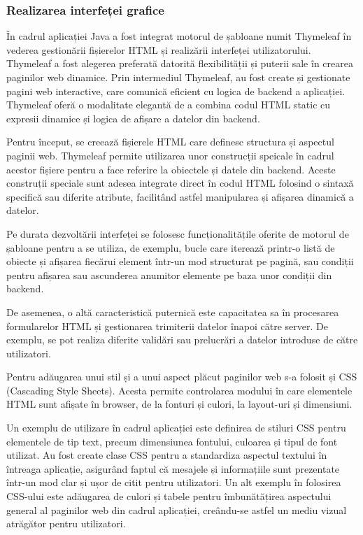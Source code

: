 \documentclass[12pt]{article}
\begin{document}
\subsubsection{Realizarea interfeței grafice}

\^{I}n cadrul aplicației Java a fost integrat motorul de șabloane numit Thymeleaf \^{i}n vederea gestion\u{a}rii fișierelor HTML și realiz\u{a}rii interfeței utilizatorului. Thymeleaf a fost alegerea preferat\u{a} datorit\u{a} flexibilit\u{a}ții și puterii sale \^{i}n crearea paginilor web dinamice. Prin intermediul Thymeleaf, au fost create și gestionate pagini web interactive, care comunic\u{a} eficient cu logica de backend a aplicației. Thymeleaf ofer\u{a} o modalitate elegant\u{a} de a combina codul HTML static cu expresii dinamice și logica de afișare a datelor din backend.

Pentru \^{i}nceput, se creeaz\u{a} fișierele HTML care definesc structura și aspectul paginii web. Thymeleaf permite utilizarea unor construcții speicale \^{i}n cadrul acestor fișiere pentru a face referire la obiectele și datele din backend. Aceste construții speciale sunt adesea integrate direct \^{i}n codul HTML folosind o sintax\u{a} specific\u{a} sau diferite atribute, facilit\^{a}nd astfel manipularea și afișarea dinamic\u{a} a datelor.

Pe durata dezvolt\u{a}rii interfeței se folosesc funcționalit\u{a}țile oferite de motorul de șabloane pentru a se utiliza, de exemplu, bucle care itereaz\u{a} printr-o list\u{a} de obiecte și afișarea fiec\u{a}rui element \^{i}ntr-un mod structurat pe pagin\u{a}, sau condiții pentru afișarea sau ascunderea anumitor elemente pe baza unor condiții din backend.

De asemenea, o alt\u{a} caracteristic\u{a} puternic\u{a} este capacitatea sa \^{i}n procesarea formularelor HTML și gestionarea trimiterii datelor \^{i}napoi c\u{a}tre server. De exemplu, se pot realiza diferite valid\u{a}ri sau prelucr\u{a}ri a datelor introduse de c\u{a}tre utilizatori.

Pentru ad\u{a}ugarea unui stil și a unui aspect pl\u{a}cut paginilor web s-a folosit și CSS (Cascading Style Sheets). Acesta permite controlarea modului \^{i}n care elementele HTML sunt afișate \^{i}n browser, de la fonturi și culori, la layout-uri și dimensiuni.

Un exemplu de utilizare \^{i}n cadrul aplicației este definirea de stiluri CSS pentru elementele de tip text, precum dimensiunea fontului, culoarea și tipul de font utilizat. Au fost create clase CSS pentru a standardiza aspectul textului \^{i}n \^{i}ntreaga aplicație, asigur\^{a}nd faptul c\u{a} mesajele și informațiile sunt prezentate \^{i}ntr-un mod clar și ușor de citit pentru utilizatori. Un alt exemplu \^{i}n folosirea CSS-ului este ad\u{a}ugarea de culori și tabele pentru \^{i}mbun\u{a}t\u{a}țirea aspectului general al paginilor web din cadrul aplicației, cre\^{a}ndu-se astfel un mediu vizual atr\u{a}g\u{a}tor pentru utilizatori.
\end{document}
